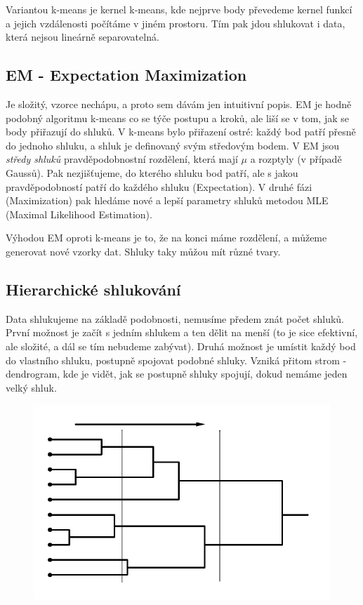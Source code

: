 \documentclass[10pt,a4paper]{article}
\begin{document}
Variantou k-means je kernel k-means, kde nejprve body převedeme kernel funkcí a jejich vzdálenosti počítáme v jiném prostoru. Tím pak jdou shlukovat i data, která nejsou lineárně separovatelná.

\subsection{EM - Expectation Maximization}

Je složitý, vzorce nechápu, a proto sem dávám jen intuitivní popis. EM je hodně podobný algoritmu k-means co se týče postupu a kroků, ale liší se v tom, jak se body přiřazují do shluků. V k-means bylo přiřazení ostré: každý bod patří přesně do jednoho shluku, a shluk je definovaný svým středovým bodem. V EM jsou \textit{středy shluků} pravděpodobnostní rozdělení, která mají $\mu$ a rozptyly (v případě Gaussů). Pak nezjišťujeme, do kterého shluku bod patří, ale s jakou pravděpodobností patří do každého shluku (Expectation). V druhé fázi (Maximization) pak hledáme nové a lepší parametry shluků metodou MLE (Maximal Likelihood Estimation).

Výhodou EM oproti k-means je to, že na konci máme rozdělení, a můžeme generovat nové vzorky dat. Shluky taky můžou mít různé tvary.


\subsection{Hierarchické shlukování}

Data shlukujeme na základě podobnosti, nemusíme předem znát počet shluků. První možnost je začít s jedním shlukem a ten dělit na menší (to je sice efektivní, ale složité, a dál se tím nebudeme zabývat). Druhá možnost je umístit každý bod do vlastního shluku, postupně spojovat podobné shluky. Vzniká přitom strom - dendrogram, kde je vidět, jak se postupně shluky spojují, dokud nemáme jeden velký shluk.

\begin{figure}[ht!]
\centering
\includegraphics{img/dendrogram.png}
\end{figure}
\end{document}
